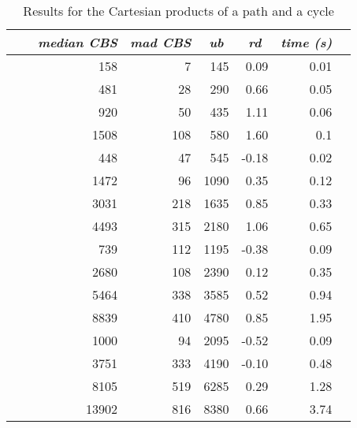 \documentclass{scrartcl}
\theoremstyle{plain}
\newcommand{\cbs}{CBS}
\begin{document}
\begin{table}[!ht]
	\centering
	\scriptsize
	\begin{tabular}{|ll|rr|r|r|r|r|} 
	\hline
	\multicolumn{1}{|c}{} &
	\multicolumn{1}{c|}{} &
	\multicolumn{1}{c}{\emph{median \cbs{}}} &
	\multicolumn{1}{c|}{\emph{mad \cbs{}}} &
	\multicolumn{1}{c|}{\emph{ub}} &
	\multicolumn{1}{c|}{\emph{rd}} &
	\multicolumn{1}{c|}{\emph{time (s)}} \\ \hline
		
	\makeatletter{} &  & 158 & 7 & 145 & 0.09 & 0.01 \\ 
 &  & 481 & 28 & 290 & 0.66 & 0.05 \\ 
 &  & 920 & 50 & 435 & 1.11 & 0.06 \\ 
 &  & 1508 & 108 & 580 & 1.60 & 0.1 \\ 
 &  & 448 & 47 & 545 & -0.18 & 0.02 \\ 
 &  & 1472 & 96 & 1090 & 0.35 & 0.12 \\ 
 &  & 3031 & 218 & 1635 & 0.85 & 0.33 \\ 
 &  & 4493 & 315 & 2180 & 1.06 & 0.65 \\ 
 &  & 739 & 112 & 1195 & -0.38 & 0.09 \\ 
 &  & 2680 & 108 & 2390 & 0.12 & 0.35 \\ 
 &  & 5464 & 338 & 3585 & 0.52 & 0.94 \\ 
 &  & 8839 & 410 & 4780 & 0.85 & 1.95 \\ 
 &  & 1000 & 94 & 2095 & -0.52 & 0.09 \\ 
 &  & 3751 & 333 & 4190 & -0.10 & 0.48 \\ 
 &  & 8105 & 519 & 6285 & 0.29 & 1.28 \\ 
 &  & 13902 & 816 & 8380 & 0.66 & 3.74 \\ 
 
	
	\hline
	\end{tabular}
	\caption{\label{tab:cart_pc_perf}Results for the Cartesian products of a 
path and a cycle}

\end{table}
\end{document}
